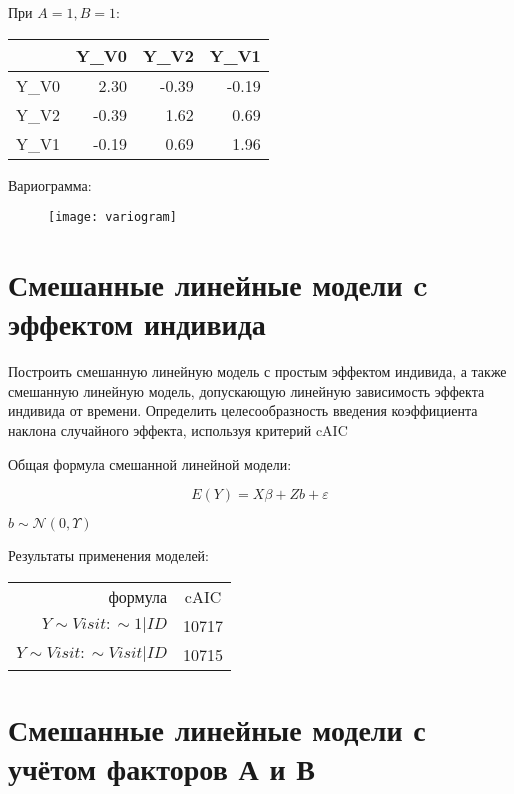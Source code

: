 \documentclass[a4paper,12pt]{article}
\newcommand{\myPictWidth}{.95\textwidth}
\begin{document}
При $ A = 1, B = 1 $:

\begin{table}[ht]
	\centering
	\begin{tabular}{rrrr}
		\hline
		& Y\_V0 & Y\_V2 & Y\_V1 \\ 
		\hline
		Y\_V0 & 2.30 & -0.39 & -0.19 \\ 
		Y\_V2 & -0.39 & 1.62 & 0.69 \\ 
		Y\_V1 & -0.19 & 0.69 & 1.96 \\ 
		\hline
	\end{tabular}
\end{table}

Вариограмма:

\begin{figure}[H]
	\centering \texttt{[image: variogram]}
\end{figure}


\section{ Смешанные линейные модели c эффектом индивида }

\begin{leftbar}
Построить смешанную линейную модель с простым эффектом индивида, а также смешанную линейную модель, допускающую линейную зависимость эффекта индивида от времени.
Определить целесообразность введения коэффициента наклона случайного эффекта, используя критерий cAIC
\end{leftbar}

Общая формула смешанной линейной модели:

\[ E(Y) = X \beta + Z b + \varepsilon  \]

$ b \sim \mathcal N(0,  \Upsilon) $

Результаты применения моделей: \\

\begin{tabular}{rc}
	формула & cAIC \\
	$ Y \sim Visit :  \sim 1 | ID $ & 10717 \\
	$ Y \sim Visit : \sim Visit | ID $ & 10715 \\
\end{tabular}

\section{ Смешанные линейные модели с учётом факторов А и В }
\end{document}
